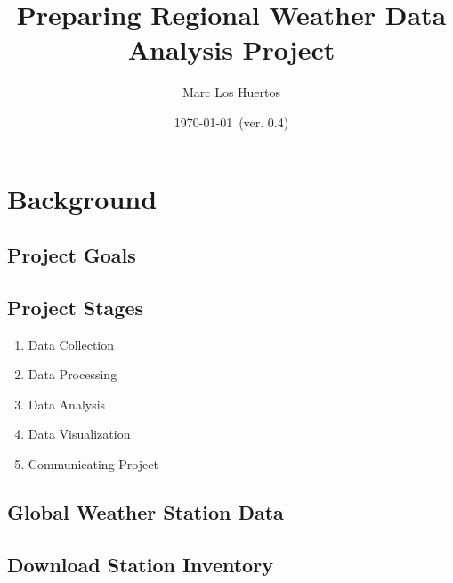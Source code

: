 \documentclass{article}\usepackage[]{graphicx}\usepackage[]{xcolor}
\title{Preparing Regional Weather Data Analysis Project}
\author{Marc Los Huertos}
\date{\today~(ver. 0.4)} %
\begin{document}
\maketitle


\section{Background}

\subsection{Project Goals}

\subsection{Project Stages}

\begin{enumerate}
  \item Data Collection
  \item Data Processing
  \item Data Analysis
  \item Data Visualization
  \item Communicating Project
\end{enumerate}


\subsection{Global Weather Station Data}

\subsection{Download Station Inventory}
\end{document}
